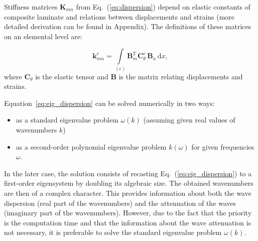 \documentclass[preprint,12pt]{elsarticle}
\newcommand{\matr}[1]{\mathbf{#1}} %
\newcommand{\ud}{\mathrm{d}}
\begin{document}
	Stiffness matrices $\matr{K}_{mn}$ from Eq.~(\ref{eq:dispersion}) depend on elastic constants of composite laminate and relations between displacements and strains (more detailed derivation can be found in Appendix). The definitions of these matrices on an elemental level are:
	
	\begin{equation}
	\matr{k}_{mn}^e= \int \limits_{(e)} \matr{B}_m^{T} \matr{C}_{\theta}^e \, \matr{B}_n\, \ud x, 
	\label{eq:stiffness_matrix_e}
	\end{equation}
	where $\matr{C}_{\theta}$ is the elastic tensor and $\matr{B}$ is the matrix relating displacements and strains.
	
	Equation~\ref{eq:eig_dispersion} can be solved numerically in two ways:
	\begin{itemize}
		\item as a standard eigenvalue problem $\omega (k)$ (assuming given real values of wavenumbers $k$)
		\item as a second-order polynomial eigenvalue problem $k(\omega)$ for given frequencies $\omega$.
	\end{itemize}
In the later case, the solution consists of recasting Eq.~(\ref{eq:eig_dispersion}) to a first-order eigensystem by doubling its algebraic size.  The obtained wavenumbers are then of a complex character. This provides information about both the wave dispersion (real part of the wavenumbers) and the attenuation of the waves (imaginary part of the wavenumbers).  However, due to the fact that the priority is the computation time and that the information about the wave attenuation is not necessary, it is preferable to solve the standard eigenvalue problem $\omega (k)$.
\end{document}
